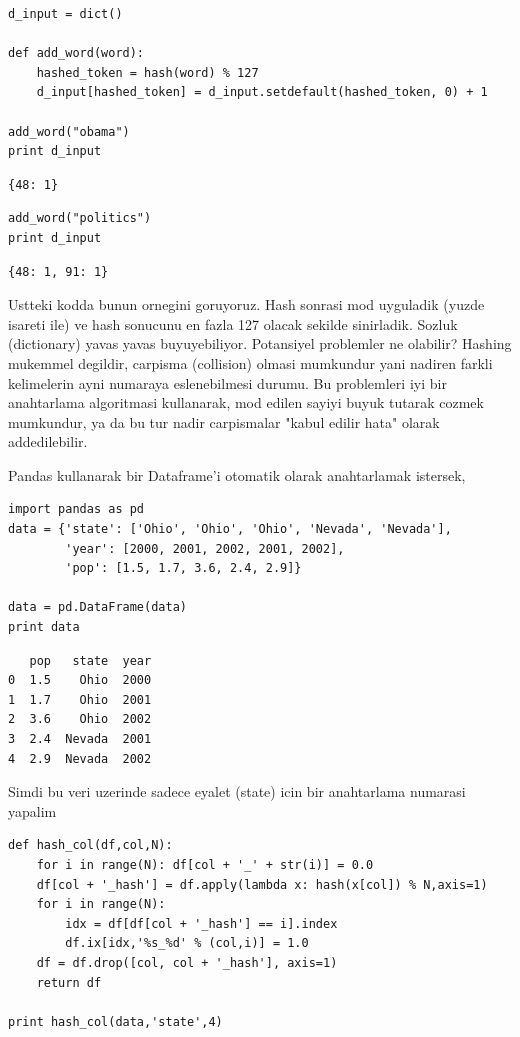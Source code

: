 \documentclass[12pt,fleqn]{article}\usepackage{../common}
\begin{document}
\begin{verbatim}
d_input = dict()

def add_word(word):
    hashed_token = hash(word) % 127
    d_input[hashed_token] = d_input.setdefault(hashed_token, 0) + 1

add_word("obama")
print d_input
\end{verbatim}

\begin{verbatim}
{48: 1}
\end{verbatim}

\begin{verbatim}
add_word("politics")
print d_input
\end{verbatim}

\begin{verbatim}
{48: 1, 91: 1}
\end{verbatim}

Ustteki kodda bunun ornegini goruyoruz. Hash sonrasi mod uyguladik
(yuzde isareti ile) ve hash sonucunu en fazla 127 olacak sekilde
sinirladik. Sozluk (dictionary) yavas yavas buyuyebiliyor.
Potansiyel problemler ne olabilir? Hashing mukemmel degildir, carpisma
(collision) olmasi mumkundur yani nadiren farkli kelimelerin ayni
numaraya eslenebilmesi durumu. Bu problemleri iyi bir anahtarlama
algoritmasi kullanarak, mod edilen sayiyi buyuk tutarak cozmek
mumkundur, ya da bu tur nadir carpismalar "kabul edilir hata" olarak
addedilebilir.

Pandas kullanarak bir Dataframe'i otomatik olarak anahtarlamak istersek,

\begin{verbatim}
import pandas as pd
data = {'state': ['Ohio', 'Ohio', 'Ohio', 'Nevada', 'Nevada'],
        'year': [2000, 2001, 2002, 2001, 2002],
        'pop': [1.5, 1.7, 3.6, 2.4, 2.9]}

data = pd.DataFrame(data)
print data
\end{verbatim}

\begin{verbatim}
   pop   state  year
0  1.5    Ohio  2000
1  1.7    Ohio  2001
2  3.6    Ohio  2002
3  2.4  Nevada  2001
4  2.9  Nevada  2002
\end{verbatim}

Simdi bu veri uzerinde sadece eyalet (state) icin bir anahtarlama numarasi
yapalim

\begin{verbatim}
def hash_col(df,col,N):
    for i in range(N): df[col + '_' + str(i)] = 0.0
    df[col + '_hash'] = df.apply(lambda x: hash(x[col]) % N,axis=1)    
    for i in range(N):
        idx = df[df[col + '_hash'] == i].index
        df.ix[idx,'%s_%d' % (col,i)] = 1.0
    df = df.drop([col, col + '_hash'], axis=1)
    return df

print hash_col(data,'state',4)
\end{verbatim}
\end{document}
